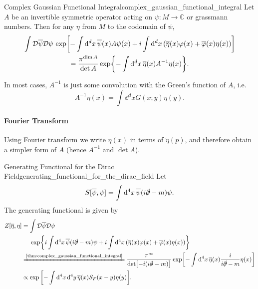 \documentclass{article}
\begin{document}
\begin{theorem}{Complex Gaussian Functional Integral}{complex_gaussian_functional_integral}
Let $A$ be an invertible symmetric operator acting on $\psi: M\rightarrow \mathbb{C}$ or grassmann numbers.
Then for any $\eta$ from $M$ to the codomain of $\psi$,
\begin{gather*}
    \int \mathcal{D}\overline{\psi}\mathcal{D}\psi\, \exp[-\int \dd{^d x} \overline{\psi}(x) A\psi(x) + i \int \dd{^d x} \qty(\overline{\eta}(x)\varphi(x) + \overline{\varphi}(x)\eta(x))] \\
    = \frac{\pi^{\dim A}}{\det A} \exp{-\int \dd{^d x} \overline{\eta}(x) A^{-1}\eta(x)}.
\end{gather*}
\end{theorem}

In most cases, $A^{-1}$ is just some convolution with the Green's function of $A$, i.e.
\[ A^{-1}\eta(x) = \int \dd{^d x} G(x;y) \eta(y). \]

\paragraph*{Fourier Transform}
Using Fourier transform we write $\eta(x)$ in terms of $\tilde{\eta}(p)$, and therefore obtain a simpler form of $A$ (hence $A^{-1}$ and $\det A$).

\begin{example}{Generating Functional for the Dirac Field}{generating_functional_for_the_dirac_field}
    Let
    \[ S[\overline{\psi},\psi] = \int \dd{^4 x} \overline{\psi}(i\slashed{\partial} - m)\psi. \]
    The generating functional is given by
    \begin{align*}
        Z[\overline{\eta}, \eta] &= \int \mathcal{D}\overline{\psi} \mathcal{D}\psi \\
        &\phantom{{}={}} \exp{i\int \dd{^4 x} \overline{\psi}(i\slashed{\partial} - m)\psi + i \int \dd{^4 x} \qty(\overline{\eta}(x)\varphi(x) + \overline{\varphi}(x)\eta(x))} \\
        &\xlongequal{\text{\cref{thm:complex_gaussian_functional_integral}}} \frac{\pi^\infty}{\det [-i(i\slashed{\partial} - m)]} \exp[-\int \dd{^4 x} \overline{\eta}(x) \frac{i}{i\slashed{\partial} - m} \eta(x)] \\ 
        &\propto \exp\qty[-\int \dd{^4 x} \dd{^4 y} \overline{\eta}(x) S_F(x-y) \eta(y)].
    \end{align*}
\end{example}
\end{document}
